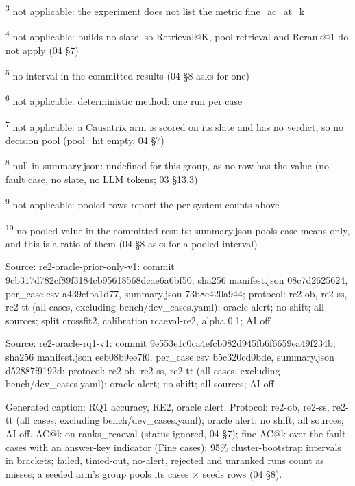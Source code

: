 \textsuperscript{3} not applicable: the experiment does not list the metric fine\_ac\_at\_k\par
\textsuperscript{4} not applicable: builds no slate, so Retrieval@K, pool retrieval and Rerank@1 do not apply (04 \S{}7)\par
\textsuperscript{5} no interval in the committed results (04 \S{}8 asks for one)\par
\textsuperscript{6} not applicable: deterministic method: one run per case\par
\textsuperscript{7} not applicable: a Causatrix arm is scored on its slate and has no verdict, so no decision pool (pool\_hit empty, 04 \S{}7)\par
\textsuperscript{8} null in summary.json: undefined for this group, as no row has the value (no fault case, no slate, no LLM tokens; 03 \S{}13.3)\par
\textsuperscript{9} not applicable: pooled rows report the per-system counts above\par
\textsuperscript{10} no pooled value in the committed results: summary.json pools case means only, and this is a ratio of them (04 \S{}8 asks for a pooled interval)\par
\noindent Source: re2-oracle-prior-only-v1: commit 9cb317d782cf89f3184cb95618568dcae6a6bf50; sha256 manifest.json 08c7d2625624, per\_case.csv a439cfba1d77, summary.json 73b8e420a944; protocol: re2-ob, re2-ss, re2-tt (all cases, excluding bench/\allowbreak{}dev\_cases.yaml); oracle alert; no shift; all sources; split crossfit2, calibration rcaeval-re2, alpha 0.1; AI off\par
\noindent Source: re2-oracle-rq1-v1: commit 9e553e1c0ca4efcb082d945fb6f6659ea49f234b; sha256 manifest.json eeb08b9ee7f0, per\_case.csv b5c320cd0bde, summary.json d52887f9192d; protocol: re2-ob, re2-ss, re2-tt (all cases, excluding bench/\allowbreak{}dev\_cases.yaml); oracle alert; no shift; all sources; AI off\par
\noindent Generated caption: RQ1 accuracy, RE2, oracle alert. Protocol: re2-ob, re2-ss, re2-tt (all cases, excluding bench/\allowbreak{}dev\_cases.yaml); oracle alert; no shift; all sources; AI off. AC@k on ranks\_rcaeval (status ignored, 04 \S{}7); fine AC@k over the fault cases with an answer-key indicator (Fine cases); 95\% cluster-bootstrap intervals in brackets; failed, timed-out, no-alert, rejected and unranked runs count as misses; a seeded arm's group pools its cases $\times$ seeds rows (04 \S{}8).\par
\endgroup
